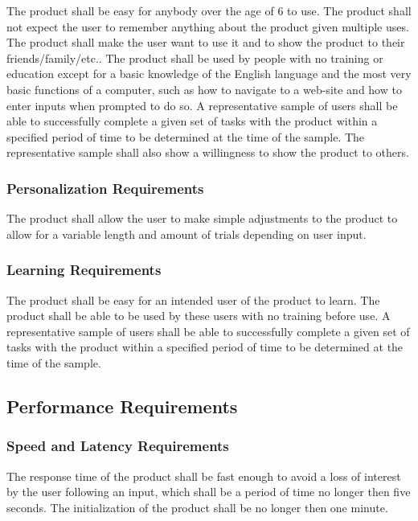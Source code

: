 \documentclass[12pt, titlepage]{article}
\begin{document}
The product shall be easy for anybody over the age of 6 to use. The product 
shall not expect the user to remember anything about the product given multiple 
uses. The product shall make the user want to use it and to show the product to 
their friends/family/etc.. The product shall be used by people with no training 
or education except for a basic knowledge of the English language and the most 
very basic functions of a computer, such as how to navigate to a web-site and 
how to enter inputs when prompted to do so. A representative sample of users 
shall be able to successfully complete a given set of tasks with the product 
within a specified period of time to be determined at the time of the sample. 
The representative sample shall also show a willingness to show the product to 
others.

\subsubsection{Personalization Requirements}

The product shall allow the user to make simple adjustments to the product to 
allow for a variable length and amount of trials depending on user input. 

\subsubsection{Learning Requirements}

The product shall be easy for an intended user of the product to learn. The 
product shall be able to be used by these users with no training before use. A 
representative sample of users shall be able to successfully complete a given 
set of tasks with the product within a specified period of time to be determined 
at the time of the sample.

\subsection{Performance Requirements}

\subsubsection{Speed and Latency Requirements}

The response time of the product shall be fast enough to avoid a loss of 
interest by the user following an input, which shall be a period of time no 
longer then five seconds. The initialization of the product shall be no longer 
then one minute.
\end{document}
